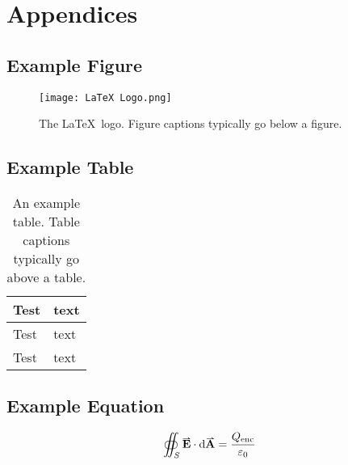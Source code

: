 \documentclass[Book Template.tex]{subfiles}
\begin{document}
    \setcounter{secnumdepth}{-1} %

    \chapter{Appendices}
        \label{ch: Appendices}
        \thispagestyle{noheader}

        \setcounter{secnumdepth}{3} %
        \setcounter{chapter}{1} %




        
        \section{Example Figure}
            \label{app: example figure}

            \begin{figure}[!h]
                \centering
                \texttt{[image: LaTeX Logo.png]}    

                \caption{The \LaTeX~logo. Figure captions typically go below a figure.}
                \label{fig: latex logo}
            \end{figure}

            \FloatBarrier

        \section{Example Table}
            \label{app: example table}

            \begin{table}[!h]
                \centering
                \caption{An example table. Table captions typically go above a table.}
                \label{table: example}
                \begin{tabular}{ |C{0.2\textwidth}|m{0.2\textwidth}| }
                    \hline
                    Test & text\\
                    \hline
                    \hline
                    Test & text\\
                    \hline
                    Test & text\\
                    \hline
                \end{tabular}
            \end{table}

        \section{Example Equation}
            \label{app: example equation}

            \begin{equation}
                \oiint_S \vect{E} \cdot \d\vect{A} = \frac{Q_{\text{enc}}}{\varepsilon_0}
                \label{eq: Gauss Law}
            \end{equation}
    
\end{document}

